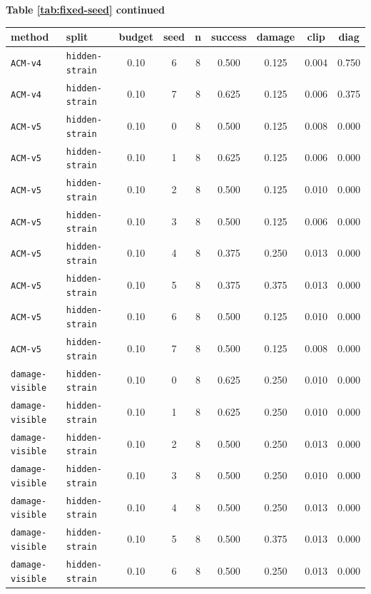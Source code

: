 \documentclass{article}
\begin{document}
\begin{center}
\textbf{Table \ref{tab:fixed-seed} continued}\\[0.4ex]
\begin{tabular}{llccccccc}
\toprule
method & split & budget & seed & n & success & damage & clip & diag \\
\midrule
\texttt{ACM-v4} & \texttt{hidden-strain} & 0.10 & 6 & 8 & 0.500 & 0.125 & 0.004 & 0.750 \\
\texttt{ACM-v4} & \texttt{hidden-strain} & 0.10 & 7 & 8 & 0.625 & 0.125 & 0.006 & 0.375 \\
\texttt{ACM-v5} & \texttt{hidden-strain} & 0.10 & 0 & 8 & 0.500 & 0.125 & 0.008 & 0.000 \\
\texttt{ACM-v5} & \texttt{hidden-strain} & 0.10 & 1 & 8 & 0.625 & 0.125 & 0.006 & 0.000 \\
\texttt{ACM-v5} & \texttt{hidden-strain} & 0.10 & 2 & 8 & 0.500 & 0.125 & 0.010 & 0.000 \\
\texttt{ACM-v5} & \texttt{hidden-strain} & 0.10 & 3 & 8 & 0.500 & 0.125 & 0.006 & 0.000 \\
\texttt{ACM-v5} & \texttt{hidden-strain} & 0.10 & 4 & 8 & 0.375 & 0.250 & 0.013 & 0.000 \\
\texttt{ACM-v5} & \texttt{hidden-strain} & 0.10 & 5 & 8 & 0.375 & 0.375 & 0.013 & 0.000 \\
\texttt{ACM-v5} & \texttt{hidden-strain} & 0.10 & 6 & 8 & 0.500 & 0.125 & 0.010 & 0.000 \\
\texttt{ACM-v5} & \texttt{hidden-strain} & 0.10 & 7 & 8 & 0.500 & 0.125 & 0.008 & 0.000 \\
\texttt{damage-visible} & \texttt{hidden-strain} & 0.10 & 0 & 8 & 0.625 & 0.250 & 0.010 & 0.000 \\
\texttt{damage-visible} & \texttt{hidden-strain} & 0.10 & 1 & 8 & 0.625 & 0.250 & 0.010 & 0.000 \\
\texttt{damage-visible} & \texttt{hidden-strain} & 0.10 & 2 & 8 & 0.500 & 0.250 & 0.013 & 0.000 \\
\texttt{damage-visible} & \texttt{hidden-strain} & 0.10 & 3 & 8 & 0.500 & 0.250 & 0.010 & 0.000 \\
\texttt{damage-visible} & \texttt{hidden-strain} & 0.10 & 4 & 8 & 0.500 & 0.250 & 0.013 & 0.000 \\
\texttt{damage-visible} & \texttt{hidden-strain} & 0.10 & 5 & 8 & 0.500 & 0.375 & 0.013 & 0.000 \\
\texttt{damage-visible} & \texttt{hidden-strain} & 0.10 & 6 & 8 & 0.500 & 0.250 & 0.013 & 0.000 \\

\end{tabular}
\end{center}
\end{document}
